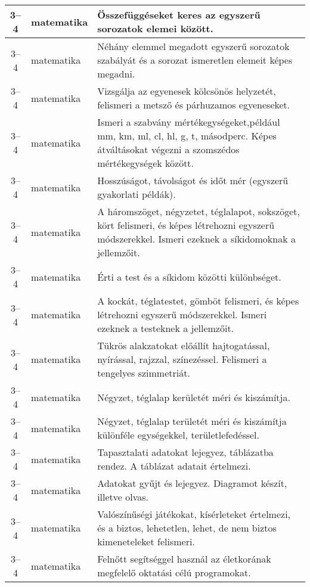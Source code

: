 \begin{small}
\begin{longtable}{c | p{2cm} |  p{11cm} }
              3--4 & matematika & Összefüggéseket keres az egyszerű sorozatok elemei között. \\ \hline
              3--4 & matematika & Néhány elemmel megadott egyszerű sorozatok szabályát és a sorozat ismeretlen elemeit képes megadni. \\ \hline
              3--4 & matematika & Vizsgálja az egyenesek kölcsönös helyzetét, felismeri a metsző és párhuzamos egyeneseket. \\ \hline
              3--4 & matematika & Ismeri a szabvány mértékegységeket,például mm, km, ml, cl, hl, g, t, másodperc. Képes átváltásokat végezni a szomszédos mértékegységek között. \\ \hline
              3--4 & matematika & Hosszúságot, távolságot és időt mér (egyszerű gyakorlati példák). \\ \hline
              3--4 & matematika & A háromszöget, négyzetet, téglalapot, sokszöget, kört felismeri, és képes létrehozni egyszerű módszerekkel. Ismeri ezeknek a síkidomoknak a jellemzőit. \\ \hline
              3--4 & matematika & Érti a test és a síkidom közötti különbséget. \\ \hline
              3--4 & matematika & A kockát, téglatestet, gömböt felismeri, és képes létrehozni egyszerű módszerekkel. Ismeri ezeknek a testeknek a jellemzőit. \\ \hline
              3--4 & matematika & Tükrös alakzatokat  előállít hajtogatással, nyírással, rajzzal, színezéssel. Felismeri a tengelyes szimmetriát. \\ \hline
              3--4 & matematika & Négyzet, téglalap kerületét méri és kiszámítja. \\ \hline
              3--4 & matematika & Négyzet, téglalap területét méri és kiszámítja különféle egységekkel, területlefedéssel. \\ \hline
              3--4 & matematika & Tapasztalati adatokat lejegyez, táblázatba rendez. A táblázat adatait értelmezi. \\ \hline
              3--4 & matematika & Adatokat gyűjt és lejegyez. Diagramot készít, illetve olvas. \\ \hline
              3--4 & matematika & Valószínűségi játékokat, kísérleteket értelmezi, és a biztos, lehetetlen, lehet, de nem biztos kimeneteleket felismeri. \\ \hline
              3--4 & matematika & Felnőtt segítséggel használ az életkorának megfelelő oktatási célú programokat. \\ \hline

\end{longtable}
\end{small}
